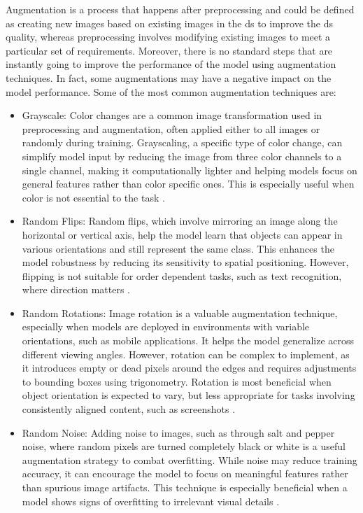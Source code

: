 Augmentation is a process that happens after preprocessing and could be defined as creating new images based on existing images in the \gls{ds} to improve the \gls{ds} quality, whereas preprocessing involves modifying existing images to meet a particular set of requirements. Moreover, there is no standard steps that are instantly going to improve the performance of the model using augmentation techniques. In fact, some augmentations may have a negative impact on the model performance. Some of the most common augmentation techniques are:
\begin{itemize}
    \item Grayscale: Color changes are a common image transformation used in preprocessing and augmentation, often applied either to all images or randomly during training. Grayscaling, a specific type of color change, can simplify model input by reducing the image from three color channels to a single channel, making it computationally lighter and helping models focus on general features rather than color specific ones. This is especially useful when color is not essential to the task \cite{Preprocessing_Augmentation}.
    \item Random Flips: Random flips, which involve mirroring an image along the horizontal or vertical axis, help the model learn that objects can appear in various orientations and still represent the same class. This enhances the model robustness by reducing its sensitivity to spatial positioning. However, flipping is not suitable for order dependent tasks, such as text recognition, where direction matters \cite{Preprocessing_Augmentation}.
    \item Random Rotations: Image rotation is a valuable augmentation technique, especially when models are deployed in environments with variable orientations, such as mobile applications. It helps the model generalize across different viewing angles. However, rotation can be complex to implement, as it introduces empty or dead pixels around the edges and requires adjustments to bounding boxes using trigonometry. Rotation is most beneficial when object orientation is expected to vary, but less appropriate for tasks involving consistently aligned content, such as screenshots \cite{Preprocessing_Augmentation}.
    \item Random Noise: Adding noise to images, such as through salt and pepper noise, where random pixels are turned completely black or white is a useful augmentation strategy to combat overfitting. While noise may reduce training accuracy, it can encourage the model to focus on meaningful features rather than spurious image artifacts. This technique is especially beneficial when a model shows signs of overfitting to irrelevant visual details \cite{Preprocessing_Augmentation}.
\end{itemize}

